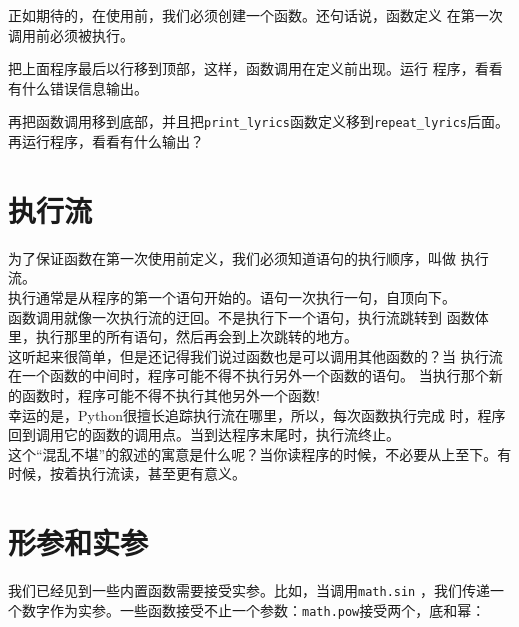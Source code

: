 
 正如期待的，在使用前，我们必须创建一个函数。还句话说，函数定义
 在第一次调用前必须被执行。

 \begin{ex}
 把上面程序最后以行移到顶部，这样，函数调用在定义前出现。运行
 程序，看看有什么错误信息输出。
 \end{ex}

 \begin{ex}
 再把函数调用移到底部，并且把\verb"print_lyrics"函数定义移到\verb"repeat_lyrics"后面。再运行程序，看看有什么输出？
 \end{ex}


\section{执行流}

为了保证函数在第一次使用前定义，我们必须知道语句的执行顺序，叫做
执行流。\\

执行通常是从程序的第一个语句开始的。语句一次执行一句，自顶向下。\\

函数调用就像一次执行流的迂回。不是执行下一个语句，执行流跳转到
函数体里，执行那里的所有语句，然后再会到上次跳转的地方。\\

这听起来很简单，但是还记得我们说过函数也是可以调用其他函数的？当
执行流在一个函数的中间时，程序可能不得不执行另外一个函数的语句。
当执行那个新的函数时，程序可能不得不执行其他另外一个函数!\\

幸运的是，Python很擅长追踪执行流在哪里，所以，每次函数执行完成
时，程序回到调用它的函数的调用点。当到达程序末尾时，执行流终止。\\

这个“混乱不堪”的叙述的寓意是什么呢？当你读程序的时候，不必要从上至下。有时候，按着执行流读，甚至更有意义。

\section{形参和实参}
\label{parameters}

我们已经见到一些内置函数需要接受实参。比如，当调用{\tt math.sin}
，我们传递一个数字作为实参。一些函数接受不止一个参数：{\tt math.pow}接受两个，底和幂：

